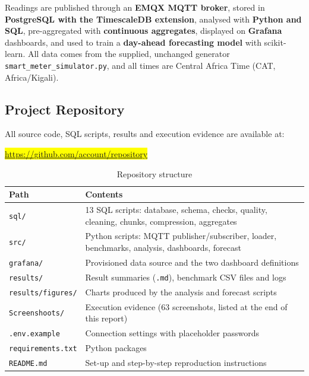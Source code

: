 \documentclass[11pt,a4paper]{article}
\newcommand{\fillin}[1]{\colorbox{yellow}{#1}}
\begin{document}
Readings are published through an \textbf{EMQX MQTT broker}, stored in \textbf{PostgreSQL with the TimescaleDB extension}, analysed with \textbf{Python and SQL}, pre-aggregated with \textbf{continuous aggregates}, displayed on \textbf{Grafana} dashboards, and used to train a \textbf{day-ahead forecasting model} with scikit-learn. All data comes from the supplied, unchanged generator \texttt{smart\_meter\_simulator.py}, and all times are Central Africa Time (CAT, Africa/Kigali).

\subsection{Project Repository}

All source code, SQL scripts, results and execution evidence are available at:

\begin{center}
\fillin{\url{https://github.com/account/repository}}
\end{center}

\begin{table}[H]
\centering
\small
\begin{tabular}{lp{11cm}}
\toprule
\textbf{Path} & \textbf{Contents} \\
\midrule
\texttt{sql/} & 13 SQL scripts: database, schema, checks, quality, cleaning, chunks, compression, aggregates \\
\texttt{src/} & Python scripts: MQTT publisher/subscriber, loader, benchmarks, analysis, dashboards, forecast \\
\texttt{grafana/} & Provisioned data source and the two dashboard definitions \\
\texttt{results/} & Result summaries (\texttt{.md}), benchmark CSV files and logs \\
\texttt{results/figures/} & Charts produced by the analysis and forecast scripts \\
\texttt{Screenshoots/} & Execution evidence (63 screenshots, listed at the end of this report) \\
\texttt{.env.example} & Connection settings with placeholder passwords \\
\texttt{requirements.txt} & Python packages \\
\texttt{README.md} & Set-up and step-by-step reproduction instructions \\
\bottomrule
\end{tabular}
\caption{Repository structure}
\end{table}
\end{document}
